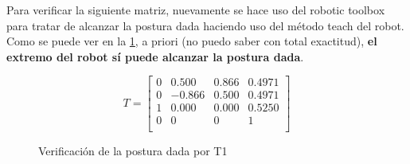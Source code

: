 \documentclass[a4paper,12pt]{article}
\begin{document}
Para verificar la siguiente matriz, nuevamente se hace uso del robotic toolbox
para tratar de alcanzar la postura dada haciendo uso del método teach del robot.
Como se puede ver en la \cref{verificacion T1}, a priori (no puedo saber con total exactitud),
\textbf{el extremo del robot sí puede alcanzar la postura dada}.

\begin{equation*}
    T = 
    \begin{bmatrix}
        0  &  0.500   & 0.866 & 0.4971   \\
        0  &  -0.866  & 0.500 & 0.4971   \\
        1  &  0.000   & 0.000 & 0.5250   \\
        0  &  0       & 0     & 1        \\
    \end{bmatrix}
\end{equation*}

\begin{figure}[H]
    \centering
    \begin{adjustbox}{max width=\columnwidth}
    \end{adjustbox}
    \caption{Verificación de la postura dada por T1}
    \label{verificacion T1}
\end{figure}
\end{document}
